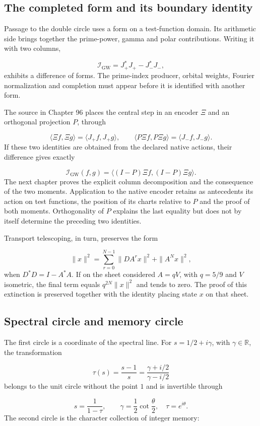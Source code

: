 \subsection{The completed form and its boundary identity}
Passage to the double circle uses a form on a test-function domain. Its arithmetic side brings together the prime-power, gamma and polar contributions. Writing it with two columns,

\[
\mathscr I_{\mathrm{GW}}=J_+^*J_+-J_-^*J_-,
\]
exhibits a difference of forms. The prime-index producer, orbital weights, Fourier normalization and completion must appear before it is identified with another form.

The source in Chapter 96 places the central step in an encoder $\Xi$ and an orthogonal projection $P$, through

\[
\langle\Xi f,\Xi g\rangle=\langle J_+f,J_+g\rangle,
\qquad
\langle P\Xi f,P\Xi g\rangle=\langle J_-f,J_-g\rangle.
\]
If these two identities are obtained from the declared native actions, their difference gives exactly

\[
\mathscr I_{\mathrm{GW}}(f,g)
=\langle(I-P)\Xi f,(I-P)\Xi g\rangle.
\]
The next chapter proves the explicit column decomposition and the consequence of the two moments. Application to the native encoder retains as antecedents its action on test functions, the position of its charts relative to $P$ and the proof of both moments. Orthogonality of $P$ explains the last equality but does not by itself determine the preceding two identities.

Transport telescoping, in turn, preserves the form

\[
\|x\|^2=\sum_{r=0}^{N-1}\|DA^rx\|^2+\|A^Nx\|^2,
\]
when $D^*D=I-A^*A$. If on the sheet considered $A=qV$, with $q=5/9$ and $V$ isometric, the final term equals $q^{2N}\|x\|^2$ and tends to zero. The proof of this extinction is preserved together with the identity placing state $x$ on that sheet.

\subsection{Spectral circle and memory circle}
The first circle is a coordinate of the spectral line. For $s=1/2+i\gamma$, with \(\gamma\in\mathbb R\), the transformation

\[
\tau(s)=\frac{s-1}{s}
=\frac{\gamma+i/2}{\gamma-i/2}
\]
belongs to the unit circle without the point \(1\) and is invertible through

\[
s=\frac1{1-\tau},\qquad
\gamma=\frac12\cot\frac{\theta}{2},\quad\tau=e^{i\theta}.
\]
The second circle is the character collection of integer memory:

